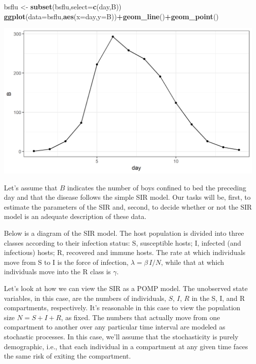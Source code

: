 \documentclass[]{article}
\newenvironment{Shaded}{\begin{snugshade}}{\end{snugshade}}
\newcommand{\KeywordTok}[1]{\textcolor[rgb]{0.13,0.29,0.53}{\textbf{#1}}}
\newcommand{\DataTypeTok}[1]{\textcolor[rgb]{0.13,0.29,0.53}{#1}}
\newcommand{\StringTok}[1]{\textcolor[rgb]{0.31,0.60,0.02}{#1}}
\newcommand{\OperatorTok}[1]{\textcolor[rgb]{0.81,0.36,0.00}{\textbf{#1}}}
\newcommand{\NormalTok}[1]{#1}
\begin{document}
\begin{Shaded}
\begin{Highlighting}[]
\NormalTok{bsflu <-}\StringTok{ }\KeywordTok{subset}\NormalTok{(bsflu,}\DataTypeTok{select=}\KeywordTok{c}\NormalTok{(day,B))}
\KeywordTok{ggplot}\NormalTok{(}\DataTypeTok{data=}\NormalTok{bsflu,}\KeywordTok{aes}\NormalTok{(}\DataTypeTok{x=}\NormalTok{day,}\DataTypeTok{y=}\NormalTok{B))}\OperatorTok{+}\KeywordTok{geom_line}\NormalTok{()}\OperatorTok{+}\KeywordTok{geom_point}\NormalTok{()}
\end{Highlighting}
\end{Shaded}

\begin{center}\includegraphics{figure/notes11-flu-data2-1} \end{center}

Let's assume that \(B\) indicates the number of boys confined to bed the
preceding day and that the disease follows the simple SIR model. Our
tasks will be, first, to estimate the parameters of the SIR and, second,
to decide whether or not the SIR model is an adequate description of
these data.

Below is a diagram of the SIR model. The host population is divided into
three classes according to their infection status: S, susceptible hosts;
I, infected (and infectious) hosts; R, recovered and immune hosts. The
rate at which individuals move from S to I is the force of infection,
\(\lambda=\beta\,I/N\), while that at which individuals move into the R
class is \(\gamma\).

\hypertarget{htmlwidget-91698f29ac8403830b98}{}

Let's look at how we can view the SIR as a POMP model. The unobserved
state variables, in this case, are the numbers of individuals, \(S\),
\(I\), \(R\) in the S, I, and R compartments, respectively. It's
reasonable in this case to view the population size \(N=S+I+R\), as
fixed. The numbers that actually move from one compartment to another
over any particular time interval are modeled as stochastic processes.
In this case, we'll assume that the stochasticity is purely demographic,
i.e., that each individual in a compartment at any given time faces the
same risk of exiting the compartment.
\end{document}
